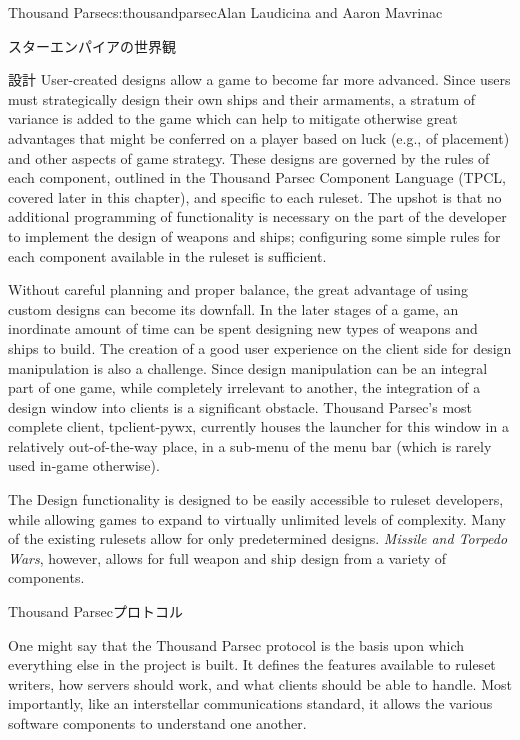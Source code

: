 \begin{aosachapter}{Thousand Parsec}{s:thousandparsec}{Alan Laudicina and Aaron Mavrinac}
\begin{aosasect1}{スターエンパイアの世界観}
\begin{aosasect2}{設計}
User-created designs allow a game to become far more advanced. Since
users must strategically design their own ships and their armaments, a
stratum of variance is added to the game which can help to mitigate
otherwise great advantages that might be conferred on a player based
on luck (e.g., of placement) and other aspects of game strategy. These
designs are governed by the rules of each component, outlined in the
Thousand Parsec Component Language (TPCL, covered later in this
chapter), and specific to each ruleset. The upshot is that no
additional programming of functionality is necessary on the part of
the developer to implement the design of weapons and ships;
configuring some simple rules for each component available in the
ruleset is sufficient.

Without careful planning and proper balance, the great advantage of
using custom designs can become its downfall. In the later stages of a
game, an inordinate amount of time can be spent designing new types of
weapons and ships to build. The creation of a good user experience on
the client side for design manipulation is also a challenge. Since
design manipulation can be an integral part of one game, while
completely irrelevant to another, the integration of a design window
into clients is a significant obstacle. Thousand Parsec's most
complete client, tpclient-pywx, currently houses the launcher for this
window in a relatively out-of-the-way place, in a sub-menu of the menu
bar (which is rarely used in-game otherwise).

The Design functionality is designed to be easily accessible to
ruleset developers, while allowing games to expand to virtually
unlimited levels of complexity.  Many of the existing rulesets allow
for only predetermined designs. \emph{Missile and Torpedo Wars},
however, allows for full weapon and ship design from a variety of
components.

\end{aosasect2}

\end{aosasect1}

\begin{aosasect1}{Thousand Parsecプロトコル}

One might say that the Thousand Parsec protocol is the basis upon
which everything else in the project is built. It defines the features
available to ruleset writers, how servers should work, and what
clients should be able to handle. Most importantly, like an
interstellar communications standard, it allows the various software
components to understand one another.


\end{aosasect1}
\end{aosachapter}
